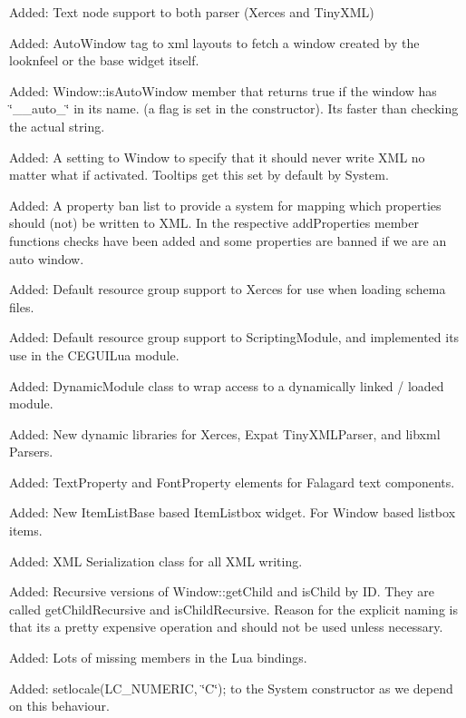 \begin{DoxyItemize}
\item Added\+: Text node support to both parser (Xerces and Tiny\+X\+ML)
\item Added\+: Auto\+Window tag to xml layouts to fetch a window created by the look\textquotesingle{}n\textquotesingle{}feel or the base widget itself.
\item Added\+: Window\+::is\+Auto\+Window member that returns true if the window has \char`\"{}\+\_\+\+\_\+auto\+\_\+\char`\"{} in its name. (a flag is set in the constructor). It\textquotesingle{}s faster than checking the actual string.
\item Added\+: A setting to Window to specify that it should never write X\+ML no matter what if activated. Tooltips get this set by default by System.
\item Added\+: A property ban list to provide a system for mapping which properties should (not) be written to X\+ML. In the respective add\+Properties member functions checks have been added and some properties are banned if we are an auto window.
\item Added\+: Default resource group support to Xerces for use when loading schema files.
\item Added\+: Default resource group support to Scripting\+Module, and implemented it\textquotesingle{}s use in the C\+E\+G\+U\+I\+Lua module.
\item Added\+: Dynamic\+Module class to wrap access to a dynamically linked / loaded module.
\item Added\+: New dynamic libraries for Xerces, Expat Tiny\+X\+M\+L\+Parser, and libxml Parsers.
\item Added\+: Text\+Property and Font\+Property elements for Falagard text components.
\item Added\+: New Item\+List\+Base based Item\+Listbox widget. For Window based listbox items.
\item Added\+: X\+ML Serialization class for all X\+ML writing.
\item Added\+: Recursive versions of Window\+::get\+Child and is\+Child by ID. They are called get\+Child\+Recursive and is\+Child\+Recursive. Reason for the explicit naming is that it\textquotesingle{}s a pretty expensive operation and should not be used unless necessary.
\item Added\+: Lots of missing members in the Lua bindings.
\item Added\+: setlocale(L\+C\+\_\+\+N\+U\+M\+E\+R\+IC, \char`\"{}\+C\char`\"{}); to the System constructor as we depend on this behaviour.

\end{DoxyItemize}
